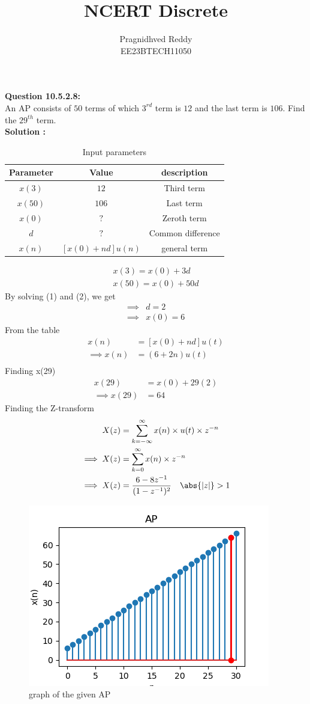 \documentclass[journal,12pt,twocolumn]{IEEEtran}
\title{NCERT Discrete}
\author{Pragnidhved Reddy\\EE23BTECH11050}
\date{}
\begin{document}
\maketitle
\newpage
\bigskip
\textbf{Question 10.5.2.8:}\\
An AP consists of $50$ terms of which $3^{rd}$ term is $12$ and the last term is $106$. Find the $29^{th}$ term.\\
\textbf{Solution :}\\
\begin{table}[H]
\centering
\begin{tabular}{|c|c|c|}\hline
\textbf{Parameter} & \textbf{Value} & \textbf{description}\\ \hline
$x(3)$ & $12$ & Third term\\ \hline
$x(50)$ & $106$ & Last term\\ \hline
$x(0)$ & $?$ & Zeroth term \\ \hline
$d$ & $?$ & Common difference\\ \hline
$x(n)$ & $[x(0)+nd]u(n)$ & general term \\ \hline
\end{tabular}
\caption{Input parameters}
\end{table}
\begin{align}
x(3)=x(0)+3d\\
x(50)=x(0)+50d
\end{align}
By solving (1) and (2), we get
\begin{align}
\implies &d=2\\
\implies &x(0)=6
\end{align}
From the table
\begin{align}
x(n)&=[x(0)+nd]u(t)\\
\implies x(n)&=(6+2n)u(t)\\
\end{align}
Finding x(29)
\begin{align}
x(29)&=x(0)+29(2)\\
\implies x(29)&=64
\end{align}
Finding the Z-transform
\begin{align}
X(z)&=\sum_{k=-\infty}^{\infty}x(n)\times u(t)\times z^{-n}\\
\implies X(z)&=\sum_{k=0}^{\infty}x(n)\times z^{-n}\\
\implies X(z)&=\frac{6-8z^{-1}}{(1-z^{-1})^2} \quad \abs{|z|}>1
\end{align}
\begin{figure}[h!]
    \centering
    \includegraphics{figs/plot.png}
    \caption{graph of the given AP}
    \label{fig:1}
\end{figure}
\end{document}
